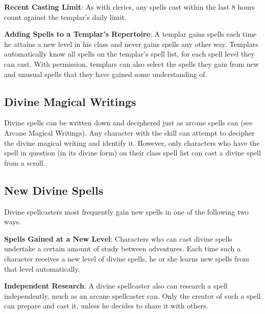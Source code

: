 \textbf{Recent Casting Limit}: As with clerics, any spells cast within the last 8 hours count against the templar's daily limit.

\textbf{Adding Spells to a Templar's Repertoire}: A templar gains spells each time he attains a new level in his class and never gains spells any other way. Templars automatically know all spells on the templar's spell list, for each spell level they can cast. With permission, templars can also select the spells they gain from new and unusual spells that they have gained some understanding of.

\subsection{Divine Magical Writings}
Divine spells can be written down and deciphered just as arcane spells can (see Arcane Magical Writings). Any character with the  skill can attempt to decipher the divine magical writing and identify it. However, only characters who have the spell in question (in its divine form) on their class spell list can cast a divine spell from a scroll.

\subsection{New Divine Spells}
Divine spellcasters most frequently gain new spells in one of the following two ways.

\textbf{Spells Gained at a New Level}: Characters who can cast divine spells undertake a certain amount of study between adventures. Each time such a character receives a new level of divine spells, he or she learns new spells from that level automatically.

\textbf{Independent Research}: A divine spellcaster also can research a spell independently, much as an arcane spellcaster can. Only the creator of such a spell can prepare and cast it, unless he decides to share it with others.